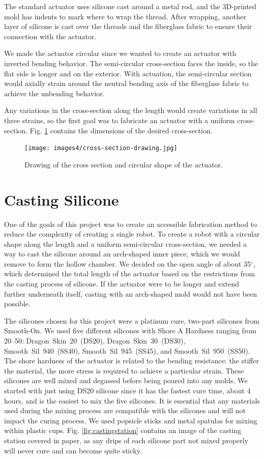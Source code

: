 The standard actuator uses silicone cast around a metal rod, and the 3D-printed mold has indents to mark where to wrap the thread. After wrapping, another layer of silicone is cast over the threads and the fiberglass fabric to ensure their connection with the actuator. 

We made the actuator circular since we wanted to create an actuator with inverted bending behavior. The semi-circular cross-section faces the inside, so the flat side is longer and on the exterior. With actuation, the semi-circular section would axially strain around the neutral bending axis of the fiberglass fabric to achieve the unbending behavior. 

Any variations in the cross-section along the length would create variations in all three strains, so the first goal was to fabricate an actuator with a uniform cross-section. Fig. \ref{fig:crosssection} contains the dimensions of the desired cross-section.

\begin{figure}[h]
    \centering
    \texttt{[image: images4/cross-section-drawing.jpg]}
    \caption{Drawing of the cross section and circular shape of the actuator.}
    \label{fig:crosssection}
\end{figure}

\section{Casting Silicone}
One of the goals of this project was to create an accessible fabrication method to reduce the complexity of creating a single robot. To create a robot with a circular shape along the length and a uniform semi-circular cross-section, we needed a way to cast the silicone around an arch-shaped inner piece, which we would remove to form the hollow chamber. We decided on the open angle of about 35$^\circ$, which determined the total length of the actuator based on the restrictions from the casting process of silicone. If the actuator were to be longer and extend further underneath itself, casting with an arch-shaped mold would not have been possible. 

The silicones chosen for this project were a platinum cure, two-part silicones from Smooth-On. We used five different silicones with Shore A Hardness ranging from 20--50: Dragon~Skin~20~(DS20), Dragon~Skin~30~(DS30), Smooth~Sil~940~(SS40), Smooth~Sil~945~(SS45), and Smooth~Sil~950~(SS50). The shore hardness of the actuator is related to the bending resistance: the stiffer the material, the more stress is required to achieve a particular strain. These silicones are well mixed and degassed before being poured into any molds. We started with just using DS20 silicone since it has the fastest cure time, about 4 hours, and is the easiest to mix the five silicones. It is essential that any materials used during the mixing process are compatible with the silicones and will not impact the curing process. We used popsicle sticks and metal spatulas for mixing within plastic cups. Fig. \ref{fig:castingstation} contains an image of the casting station covered in paper, as any drips of each silicone part not mixed properly will never cure and can become quite sticky. 

